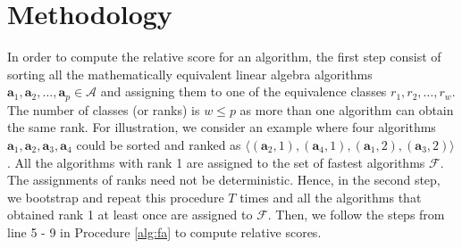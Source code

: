 \documentclass[conference]{IEEEtran}
\begin{document}
\section{Methodology}
\label{sec:met}

In order to compute the relative score for an algorithm, the first step consist of sorting all the mathematically
equivalent linear algebra algorithms $\mathbf{a}_1,\mathbf{a}_2, \dots, \mathbf{a}_p \in \mathcal{A}$ and assigning them
to one of the equivalence classes $r_1, r_2, \dots,r_w$. The number of classes (or ranks) is $w \le p$ as more than one
algorithm can obtain the same rank. For illustration, we consider an example where four algorithms
$\mathbf{a}_1,\mathbf{a}_2, \mathbf{a}_3, \mathbf{a}_4$ could be sorted and ranked as $\langle (\mathbf{a}_2,1),
(\mathbf{a}_4,1), (\mathbf{a}_1,2), (\mathbf{a}_3,2) \rangle$. 
  All the algorithms with rank 1 are assigned to the set of fastest algorithms $\mathcal{F}$. The assignments of ranks
  need not be deterministic. Hence, in the second step, we bootstrap and repeat this procedure $T$ times and all the algorithms that obtained rank 1 at least once are assigned to $\mathcal{F}$. Then, we follow the steps from line 5 - 9 in Procedure \ref{alg:fa} to compute relative scores. 
\end{document}
